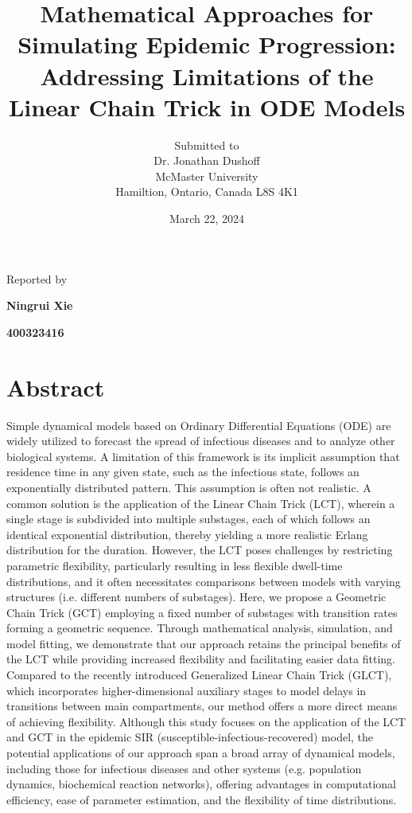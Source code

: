 \documentclass[12pt]{article}
\begin{document}
\title{Mathematical Approaches for Simulating Epidemic Progression: Addressing Limitations of the Linear Chain Trick in ODE Models}

\author{Submitted to\\ Dr. Jonathan Dushoff 
\\McMaster University\\Hamiltion, Ontario, Canada L8S 4K1}
\date {March 22, 2024}
\maketitle


\centerline{Reported by}
\centerline{\textbf{Ningrui Xie}}
\centerline{\textbf{400323416}}


\newpage
\section*{Abstract}
Simple dynamical models based on Ordinary Differential Equations (ODE) are widely utilized to forecast the spread of infectious diseases and to analyze other biological systems. A limitation of this framework is its implicit assumption that residence time in any given state, such as the infectious state, follows an exponentially distributed pattern. This assumption is often not realistic. A common solution is the application of the Linear Chain Trick (LCT), wherein a single stage is subdivided into multiple substages, each of which follows an identical exponential distribution, thereby yielding a more realistic Erlang distribution for the duration. However, the LCT poses challenges by restricting parametric flexibility, particularly resulting in less flexible dwell-time distributions, and it often necessitates comparisons between models with varying structures (i.e. different numbers of substages). Here, we propose a Geometric Chain Trick (GCT) employing a fixed number of substages with transition rates forming a geometric sequence. Through mathematical analysis, simulation, and model fitting, we demonstrate that our approach retains the principal benefits of the LCT while providing increased flexibility and facilitating easier data fitting. Compared to the recently introduced Generalized Linear Chain Trick (GLCT), which incorporates higher-dimensional auxiliary stages to model delays in transitions between main compartments, our method offers a more direct means of achieving flexibility. Although this study focuses on the application of the LCT and GCT in the epidemic SIR (susceptible-infectious-recovered) model, the potential applications of our approach span a broad array of dynamical models, including those for infectious diseases and other systems (e.g. population dynamics, biochemical reaction networks), offering advantages in computational efficiency, ease of parameter estimation, and the flexibility of time distributions.
\end{document}
